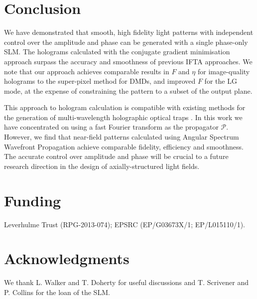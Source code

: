 \documentclass[amsmath,onecolumn,superscriptaddress,notitlepage]{revtex4-1}
\begin{document}
\section{Conclusion}

We have demonstrated that smooth, high fidelity light patterns with independent control over the amplitude and phase can be generated with a single phase-only SLM. The holograms calculated with the conjugate gradient minimisation approach surpass the accuracy and smoothness of previous IFTA approaches. We note that our approach achieves comparable results in $F$ and $\eta$ for image-quality holograms to the super-pixel method for DMDs\cite{Goorden+14}, and improved $F$ for the LG mode, at the expense of constraining the pattern to a subset of the output plane. 

This approach to hologram calculation is compatible with existing methods for the generation of multi-wavelength holographic optical traps \cite{Bowman+15}. In this work we have concentrated on using a fast Fourier transform as the propagator $\mathcal{P}$. However, we find that near-field patterns calculated using Angular Spectrum Wavefront Propagation \cite{Goodman+96} achieve comparable fidelity, efficiency and smoothness. The accurate control over amplitude and phase will be crucial to a future research direction in the design of axially-structured light fields.


\section*{Funding}
Leverhulme Trust (RPG-2013-074); EPSRC (EP/G03673X/1; EP/L015110/1).

\section*{Acknowledgments}
We thank 
L. Walker and T. Doherty for useful discussions and T. Scrivener and P. Collins for the loan of the SLM. 
\end{document}
